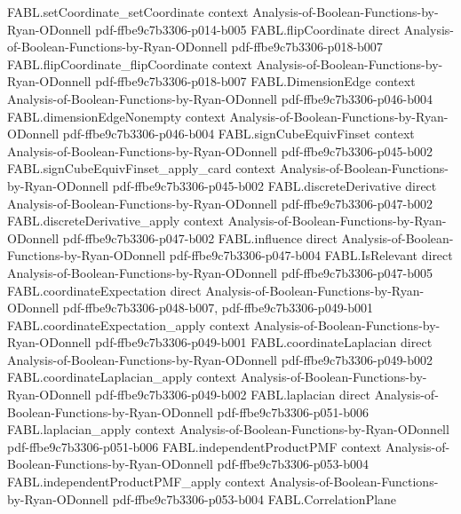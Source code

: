 \begin{theorem}
\proofstep
  {FABL.setCoordinate_setCoordinate}
  {context}
  {Analysis-of-Boolean-Functions-by-Ryan-ODonnell}
  {pdf-ffbe9c7b3306-p014-b005}
\proofstep
  {FABL.flipCoordinate}
  {direct}
  {Analysis-of-Boolean-Functions-by-Ryan-ODonnell}
  {pdf-ffbe9c7b3306-p018-b007}
\proofstep
  {FABL.flipCoordinate_flipCoordinate}
  {context}
  {Analysis-of-Boolean-Functions-by-Ryan-ODonnell}
  {pdf-ffbe9c7b3306-p018-b007}
\proofstep
  {FABL.DimensionEdge}
  {context}
  {Analysis-of-Boolean-Functions-by-Ryan-ODonnell}
  {pdf-ffbe9c7b3306-p046-b004}
\proofstep
  {FABL.dimensionEdgeNonempty}
  {context}
  {Analysis-of-Boolean-Functions-by-Ryan-ODonnell}
  {pdf-ffbe9c7b3306-p046-b004}
\proofstep
  {FABL.signCubeEquivFinset}
  {context}
  {Analysis-of-Boolean-Functions-by-Ryan-ODonnell}
  {pdf-ffbe9c7b3306-p045-b002}
\proofstep
  {FABL.signCubeEquivFinset_apply_card}
  {context}
  {Analysis-of-Boolean-Functions-by-Ryan-ODonnell}
  {pdf-ffbe9c7b3306-p045-b002}
\proofstep
  {FABL.discreteDerivative}
  {direct}
  {Analysis-of-Boolean-Functions-by-Ryan-ODonnell}
  {pdf-ffbe9c7b3306-p047-b002}
\proofstep
  {FABL.discreteDerivative_apply}
  {context}
  {Analysis-of-Boolean-Functions-by-Ryan-ODonnell}
  {pdf-ffbe9c7b3306-p047-b002}
\proofstep
  {FABL.influence}
  {direct}
  {Analysis-of-Boolean-Functions-by-Ryan-ODonnell}
  {pdf-ffbe9c7b3306-p047-b004}
\proofstep
  {FABL.IsRelevant}
  {direct}
  {Analysis-of-Boolean-Functions-by-Ryan-ODonnell}
  {pdf-ffbe9c7b3306-p047-b005}
\proofstep
  {FABL.coordinateExpectation}
  {direct}
  {Analysis-of-Boolean-Functions-by-Ryan-ODonnell}
  {pdf-ffbe9c7b3306-p048-b007,
    pdf-ffbe9c7b3306-p049-b001}
\proofstep
  {FABL.coordinateExpectation_apply}
  {context}
  {Analysis-of-Boolean-Functions-by-Ryan-ODonnell}
  {pdf-ffbe9c7b3306-p049-b001}
\proofstep
  {FABL.coordinateLaplacian}
  {direct}
  {Analysis-of-Boolean-Functions-by-Ryan-ODonnell}
  {pdf-ffbe9c7b3306-p049-b002}
\proofstep
  {FABL.coordinateLaplacian_apply}
  {context}
  {Analysis-of-Boolean-Functions-by-Ryan-ODonnell}
  {pdf-ffbe9c7b3306-p049-b002}
\proofstep
  {FABL.laplacian}
  {direct}
  {Analysis-of-Boolean-Functions-by-Ryan-ODonnell}
  {pdf-ffbe9c7b3306-p051-b006}
\proofstep
  {FABL.laplacian_apply}
  {context}
  {Analysis-of-Boolean-Functions-by-Ryan-ODonnell}
  {pdf-ffbe9c7b3306-p051-b006}
\proofstep
  {FABL.independentProductPMF}
  {context}
  {Analysis-of-Boolean-Functions-by-Ryan-ODonnell}
  {pdf-ffbe9c7b3306-p053-b004}
\proofstep
  {FABL.independentProductPMF_apply}
  {context}
  {Analysis-of-Boolean-Functions-by-Ryan-ODonnell}
  {pdf-ffbe9c7b3306-p053-b004}
\proofstep
  {FABL.CorrelationPlane}

\end{theorem}

